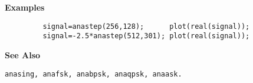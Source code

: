 {\bf \large {}\selectfont Examples}
\begin{verbatim}
         signal=anastep(256,128);      plot(real(signal));
         signal=-2.5*anastep(512,301); plot(real(signal));
\end{verbatim}
\vspace*{.5cm}


{\bf \large {}\selectfont See Also}\\
\hspace*{1.5cm}
\begin{minipage}[t]{13.5cm}
\begin{verbatim}
anasing, anafsk, anabpsk, anaqpsk, anaask.
\end{verbatim}
\end{minipage}




